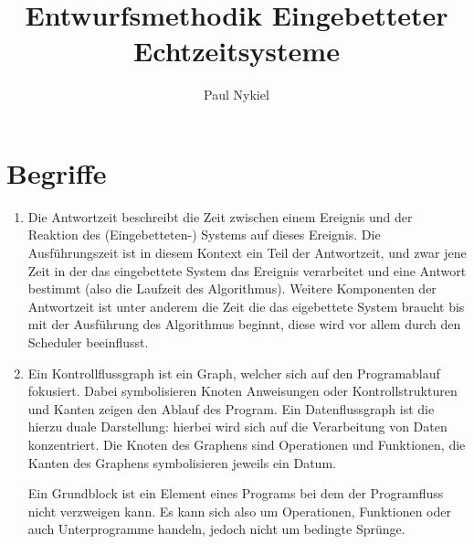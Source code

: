 \documentclass[DIN, pagenumber=false, fontsize=11pt, parskip=half]{scrartcl}
\title{Entwurfsmethodik Eingebetteter Echtzeitsysteme}
\author{Paul Nykiel}
\begin{document}
    \maketitle
    \section{Begriffe}
    \begin{enumerate}[label=\alph*)]
        \item Die Antwortzeit beschreibt die Zeit zwischen einem Ereignis und
            der Reaktion des (Eingebetteten-) Systems auf dieses Ereignis. Die
            Ausführungszeit ist in diesem Kontext ein Teil der Antwortzeit, und zwar
            jene Zeit in der das eingebettete System das Ereignis verarbeitet und eine
            Antwort bestimmt (also die Laufzeit des Algorithmus). Weitere Komponenten
            der Antwortzeit ist unter anderem die Zeit die das eigebettete System
            braucht bis mit der Ausführung des Algorithmus beginnt, diese wird
            vor allem durch den Scheduler beeinflusst. 
        \item Ein Kontrollflussgraph ist ein Graph, welcher sich auf den Programablauf
            fokusiert. Dabei symbolisieren Knoten Anweisungen oder Kontrollstrukturen
            und Kanten zeigen den Ablauf des Program. Ein Datenflussgraph ist die hierzu
            duale Darstellung: hierbei wird sich auf die Verarbeitung von Daten 
            konzentriert. Die Knoten des Graphens sind Operationen und Funktionen,
            die Kanten des Graphens symbolisieren jeweils ein Datum.

            Ein Grundblock ist ein Element eines Programs bei dem der Programfluss
            nicht verzweigen kann. Es kann sich also um Operationen, Funktionen
            oder auch Unterprogramme handeln, jedoch nicht um bedingte Sprünge.
    \end{enumerate}
\end{document}
